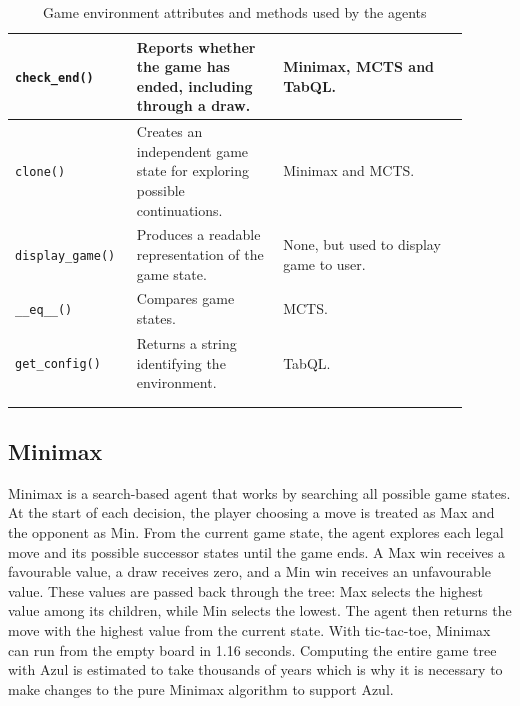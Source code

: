 \begin{longtable}{@{}p{0.22\linewidth}p{0.30\linewidth}p{0.38\linewidth}@{}}
\texttt{check\_\allowbreak end()}
& Reports whether the game has ended, including through a draw.
& Minimax, MCTS and TabQL.\\
\hline

\texttt{clone()}
& Creates an independent game state for exploring possible continuations.
& Minimax and MCTS.\\
\hline

\texttt{display\_\allowbreak game()}
& Produces a readable representation of the game state.
& None, but used to display game to user.\\
\hline

\texttt{\_\_eq\_\_()}
& Compares game states.
& MCTS.\\
\hline

\texttt{get\_\allowbreak config()}
& Returns a string identifying the environment.
& TabQL.\\
\hline

\hline\\
\caption{Game environment attributes and methods used by the agents}
\label{tab:game-environment-interface}\\
\end{longtable}


\subsection{Minimax}

Minimax is a search-based agent that works by searching all possible game states. At the start of each decision, the player choosing a move is treated as Max and the opponent as Min. From the current game state, the agent explores each legal move and its possible successor states until the game ends. A Max win receives a favourable value, a draw receives zero, and a Min win receives an unfavourable value. These values are passed back through the tree: Max selects the highest value among its children, while Min selects the lowest. The agent then returns the move with the highest value from the current state. With tic-tac-toe, Minimax can run from the empty board in 1.16 seconds. Computing the entire game tree with Azul is estimated to take thousands of years which is why it is necessary to make changes to the pure Minimax algorithm to support Azul.

